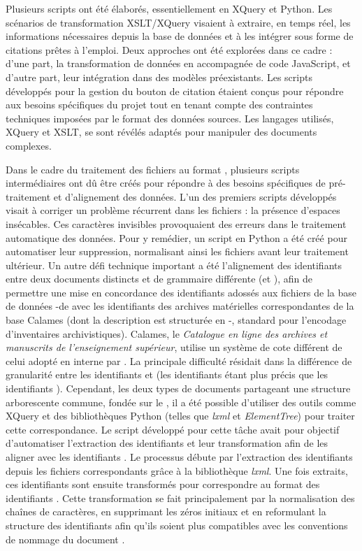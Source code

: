 Plusieurs scripts ont été élaborés, essentiellement en XQuery et Python. Les scénarios de transformation XSLT/XQuery visaient à extraire, en temps réel, les informations nécessaires depuis la base de données et à les intégrer sous forme de citations prêtes à l'emploi. Deux approches ont été explorées dans ce cadre : d'une part, la transformation de données en \html accompagnée de code JavaScript, et d'autre part, leur intégration dans des modèles \html préexistants.
Les scripts développés pour la gestion du bouton de citation étaient conçus pour répondre aux besoins spécifiques du projet tout en tenant compte des contraintes techniques imposées par le format des données sources. Les langages utilisés, XQuery et XSLT, se sont révélés adaptés pour manipuler des documents \xml complexes.

Dans le cadre du traitement des fichiers \xml au format \tei, plusieurs scripts intermédiaires ont dû être créés pour répondre à des besoins spécifiques de pré-traitement et d'alignement des données. L’un des premiers scripts développés visait à corriger un problème récurrent dans les fichiers \tei : la présence d’espaces insécables. Ces caractères invisibles provoquaient des erreurs dans le traitement automatique des données. Pour y remédier, un script en Python a été créé pour automatiser leur suppression, normalisant ainsi les fichiers avant leur traitement ultérieur.
Un autre défi technique important a été l’alignement des identifiants entre deux documents \xml distincts et de grammaire différente (\tei et \ead), afin de permettre une mise en concordance des identifiants adossés aux fichiers de la base de données \xml-\tei de \pense avec les identifiants des archives matérielles correspondantes de la base Calames (dont la description est structurée en \xml-\ead, standard pour l’encodage d’inventaires archivistiques). Calames, le \textit{Catalogue en ligne des archives et manuscrits de l’enseignement supérieur}, utilise un système de cote différent de celui adopté en interne par \pense. La principale difficulté résidait dans la différence de granularité entre les identifiants \ead et \tei (les identifiants \tei étant plus précis que les identifiants \ead). Cependant, les deux types de documents partageant une structure arborescente commune, fondée sur le \xml, il a été possible d'utiliser des outils comme XQuery et des bibliothèques Python (telles que \textit{lxml} et \textit{ElementTree}) pour traiter cette correspondance.
Le script développé pour cette tâche avait pour objectif d’automatiser l’extraction des identifiants \tei et leur transformation afin de les aligner avec les identifiants \ead. Le processus débute par l'extraction des identifiants \tei depuis les fichiers correspondants grâce à la bibliothèque \textit{lxml}. Une fois extraits, ces identifiants sont ensuite transformés pour correspondre au format des identifiants \ead. Cette transformation se fait principalement par la normalisation des chaînes de caractères, en supprimant les zéros initiaux et en reformulant la structure des identifiants afin qu’ils soient plus compatibles avec les conventions de nommage du document \ead.
